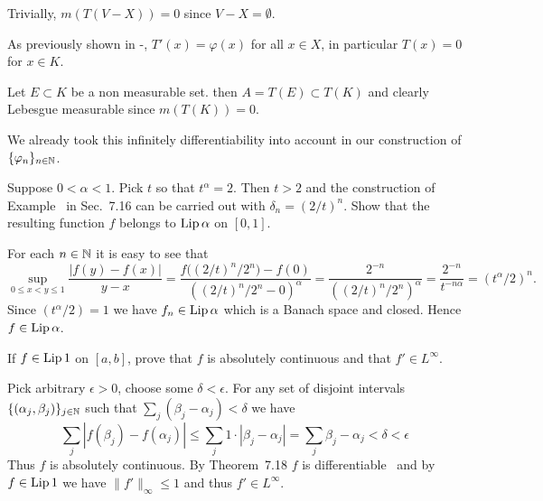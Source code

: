\begin{enumerate}
\begin{itemize}
\begin{itemize}
Trivially, \(m(T(V-X))=0\) since \(V-X=\emptyset\).
\end{itemize}

As previously shown in -, 
\(T'(x)=\varphi(x)\) for all \(x\in X\),
in particular \(T(x)=0\) for \(x\in K\).

Let \(E\subset K\) be a non measurable set.
then \(A=T(E)\subset T(K)\) and clearly Lebesgue measurable
since \(m(T(K)) = 0\).

We already took this infinitely differentiability into account
in our construction of \(\{\varphi_n\}_{n\in\mathbb{N}}\).
\end{itemize}

\begin{excopy}
Suppose \(0<\alpha < 1\). Pick $t$ so that \(t^\alpha = 2\). Then
\(t>2\) and the construction of Example~ in Sec.~7.16 can be
carried out with \(\delta_n = (2/t)^n\). Show that the resulting function $f$
belongs to \(\mathop{\rm Lip}\nolimits \alpha\) on \([0,1]\).
\end{excopy}

For each \(n\in\mathbb{N}\) it is easy to see that
\begin{equation*}
\sup_{0\leq x <y\leq1} \frac{|f(y)-f(x)|}{y-x}
= \frac{f\bigl((2/t)^n/2^n\bigr) - f(0)}{
        \left((2/t)^n/2^n - 0\right)^\alpha}
= \frac{2^{-n}}{\left((2/t)^n/2^n\right)^\alpha}
= \frac{2^{-n}}{t^{-n\alpha}}
= (t^\alpha/2)^n.
\end{equation*}
Since \((t^\alpha/2)=1\) we have \(f_n\in\mathop{\rm Lip}\nolimits\alpha\)
which is a Banach space and closed. Hence \(f\in\mathop{\rm Lip}\nolimits\alpha\).


\begin{excopy}
If 
\(f\in \mathop{\rm Lip}\nolimits 1\) on \([a,b]\), prove that $f$ is absolutely continuous
and that \(f'\in L^\infty\).
\end{excopy}

Pick arbitrary \(\epsilon>0\), choose some \(\delta < \epsilon\).
For any set of disjoint intervals \(\{(\alpha_j,\beta_j)\}_{j\in\mathbb{N}}\)
such that \(\sum_j (\beta_j - \alpha_j) < \delta\) we have
\begin{equation*}
\sum_j |f(\beta_j) - f(\alpha_j)|
\leq \sum_j 1\cdot|\beta_j - \alpha_j|
= \sum_j \beta_j - \alpha_j < \delta < \epsilon
\end{equation*}
Thus $f$ is absolutely continuous.
By Theorem~7.18 $f$ is differentiable \aded\ and 
by \(f\in\mathop{\rm Lip}\nolimits 1\) we have \(\|f'\|_{\infty} \leq 1\) and thus
\(f'\in L^\infty\).



\end{enumerate}
